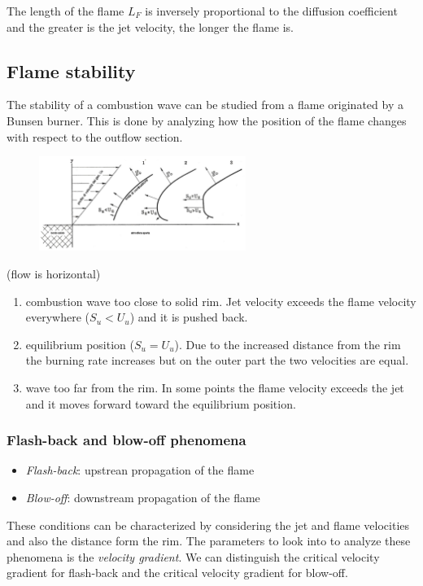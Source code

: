 \documentclass[12pt]{article}
\begin{document}
The length of the flame $L_{F}$ is inversely proportional to the diffusion coefficient and the greater is the jet velocity, the longer the flame is.

\subsection{Flame stability}

The stability of a combustion wave can be studied from a flame originated by a Bunsen burner. This is done by analyzing how the position of the flame changes with respect to the outflow section.

\begin{figure}[h!]
\centering
\includegraphics[width=0.6\textwidth]{figures/stability2.png}
\end{figure}

(flow is horizontal)
\begin{enumerate}
    \item combustion wave too close to solid rim. Jet velocity exceeds the flame velocity everywhere ($S_{u}<U_{u}$) and it is pushed back.
    \item equilibrium position ($S_{u}=U_{u}$). Due to the increased distance from the rim the burning rate increases but on the outer part the two velocities are equal.
    \item wave too far from the rim. In some points the flame velocity exceeds the jet and it moves forward toward the equilibrium position.
\end{enumerate}

\subsubsection{Flash-back and blow-off phenomena}

\begin{itemize}
    \item \textit{Flash-back}: upstrean propagation of the flame
    \item \textit{Blow-off}: downstream propagation of the flame
\end{itemize}
These conditions can be characterized by considering the jet and flame velocities and also the distance form the rim.
The parameters to look into to analyze these phenomena is the \textit{velocity gradient}. We can distinguish the critical velocity gradient for flash-back and the critical velocity gradient for blow-off.
\end{document}
